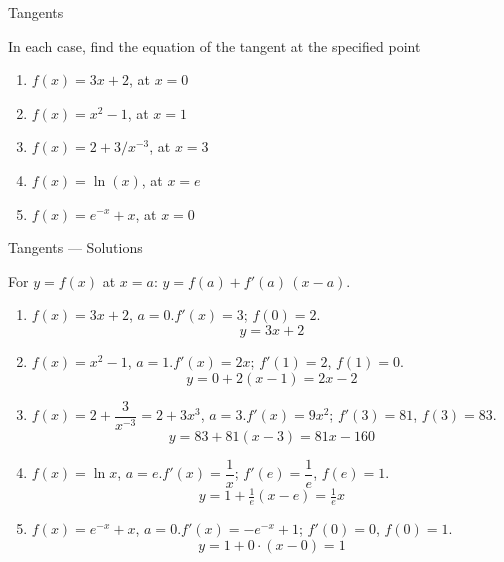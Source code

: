 \documentclass[9pt]{beamer}
\begin{document}
\begin{frame}{Tangents}

    In each case, find the equation of the tangent at the specified point

    \begin{enumerate}[leftmargin = 0.5cm, label = (\alph*), rightmargin = 0.2cm]

        \item $f(x) = 3x + 2$, at $x = 0$

        \item $f(x) = x^2 - 1$, at $x= 1$

        \item $f(x) = 2 + 3/x^{-3}$, at $x = 3$

        \item $f(x) = \ln(x)$, at $x = e$

        \item $f(x) = e^{-x} + x$, at $x = 0$
        
    \end{enumerate}
    
\end{frame}

\begin{frame}{Tangents — Solutions}

\small
For $y=f(x)$ at $x=a$: \quad $\displaystyle y = f(a) + f'(a)\,(x-a)$.

\begin{enumerate}[leftmargin=0.5cm, label=(\alph*), rightmargin=0.2cm]

\item $f(x)=3x+2$, $a=0$.\quad $f'(x)=3$; $f(0)=2$.
\[
\boxed{\,y=3x+2\,}
\]

\item $f(x)=x^2-1$, $a=1$.\quad $f'(x)=2x$; $f'(1)=2$, $f(1)=0$.
\[
\boxed{\,y=0+2(x-1)=2x-2\,}
\]

\item $f(x)=2+\dfrac{3}{x^{-3}}=2+3x^{3}$, $a=3$.\quad $f'(x)=9x^{2}$; $f'(3)=81$, $f(3)=83$.
\[
\boxed{\,y=83+81(x-3)=81x-160\,}
\]

\item $f(x)=\ln x$, $a=e$.\quad $f'(x)=\dfrac{1}{x}$; $f'(e)=\dfrac{1}{e}$, $f(e)=1$.
\[
\boxed{\,y=1+\tfrac{1}{e}(x-e)=\tfrac{1}{e}x\,}
\]

\item $f(x)=e^{-x}+x$, $a=0$.\quad $f'(x)=-e^{-x}+1$; $f'(0)=0$, $f(0)=1$.
\[
\boxed{\,y=1+0\cdot(x-0)=1\,}
\]

\end{enumerate}
\end{frame}
\end{document}
